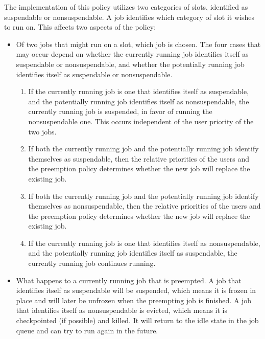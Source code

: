 The implementation of this policy utilizes two categories of slots,
identified as suspendable or nonsuspendable.
A job identifies which category of slot it wishes to run on.
This affects two aspects of the policy:
\begin{itemize}
\item{Of two jobs that might run on a slot, which job is chosen.} 
The four cases that may occur depend on
whether the currently running job identifies itself as 
suspendable or nonsuspendable, and whether the potentially running job
identifies itself as suspendable or nonsuspendable.
  \begin{enumerate}
  \item If the currently running job is one that identifies 
  itself as suspendable,
  and the potentially running job identifies itself as nonsuspendable,
  the currently running job is suspended, in favor of running the
  nonsuspendable one.  This occurs independent of the user priority of
  the two jobs.
  \item If both the currently running job and the potentially running job 
  identify themselves as suspendable,
  then the relative priorities of the users and the preemption policy determines whether the new job will replace the existing job.
  \item If both the currently running job and the potentially running job 
  identify themselves as nonsuspendable,
  then the relative priorities of the users and the preemption policy determines whether the new job will replace the existing job.
  \item If the currently running job is one that identifies 
  itself as nonsuspendable,
  and the potentially running job identifies itself as suspendable,
  the currently running job continues running.
  \end{enumerate}
\item{What happens to a currently running job that is preempted.}
A job that identifies itself as suspendable will be suspended, which
means it is frozen in place and will later be unfrozen when the
preempting job is finished.  A job that identifies itself as
nonsuspendable is evicted, which means it is checkpointed (if possible)
and killed.  It will return to the idle state in the job queue and can
try to run again in the future.
\end{itemize}


